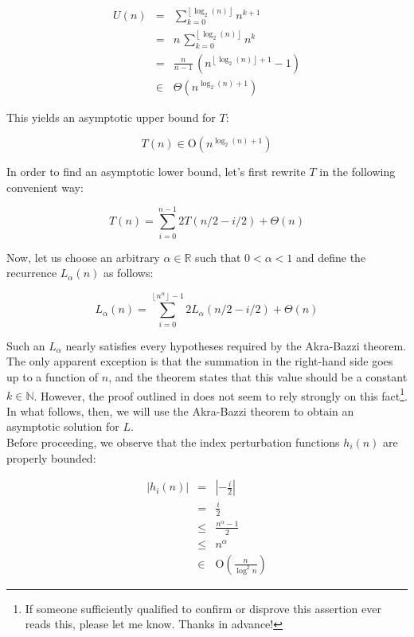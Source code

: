 \documentclass[a4paper,10pt]{article}
\newcommand{\BigO}[1]{\ensuremath{\textrm{O}\left(#1\right)}}
\newcommand{\Nat}{\ensuremath{\mathbb{N}}}
\newcommand{\Real}{\ensuremath{\mathbb{R}}}
\newcommand{\floor}[1]{\ensuremath{\left\lfloor #1 \right\rfloor}}
\begin{document}
\begin{eqnarray*}
    U(n) &=& \displaystyle \sum_{k = 0}^{\floor{\log_2(n)}}{n^{k+1}} \\
         &=& n \, \displaystyle \sum_{k = 0}^{\floor{\log_2(n)}}{n^k} \\
         &=& \frac{n}{n-1} \, \left(n^{\floor{\log_2(n)} + 1} - 1 \right) \\
         &\in& \Theta \left(n^{\log_2(n) + 1} \right)
\end{eqnarray*}

This yields an asymptotic upper bound for $T$:

\begin{equation}
\label{eq:bigO}
    T(n) \in \BigO{n^{\log_2(n) + 1}}
\end{equation}

In order to find an asymptotic lower bound, let's first rewrite $T$ in the following convenient way:

\begin{equation*}
    T(n) = \displaystyle \sum_{i = 0}^{n-1}{2T(n/2 - i/2)} + \Theta(n)
\end{equation*} 

Now, let us choose an arbitrary $\alpha \in \Real$ such that $0 < \alpha < 1$ and define the recurrence $L_{\alpha}(n)$ as follows:

\begin{equation*}
    L_{\alpha}(n) = \displaystyle \sum_{i = 0}^{\floor{n^{\alpha}} - 1}{2L_{\alpha}(n/2 - i/2)} + \Theta(n)
\end{equation*}

Such an $L_{\alpha}$ nearly satisfies every hypotheses required by the Akra-Bazzi theorem\cite{AB}. The only apparent exception is that the summation in the right-hand side goes up to a function of $n$, and the theorem states that this value should be a constant $k \in \Nat$. However, the proof outlined in \cite{AB} does not seem to rely strongly on this fact\footnote{If someone sufficiently qualified to confirm or disprove this assertion ever reads this, please let me know. Thanks in advance!}. In what follows, then, we will use the Akra-Bazzi theorem to obtain an asymptotic solution for $L$.\\

Before proceeding, we observe that the index perturbation functions $h_i(n)$ are properly bounded:

\begin{eqnarray}
\label{eq:h}
    |h_i(n)| &=& |-\frac{i}{2}| \nonumber \\
             &=& \frac{i}{2} \nonumber \\
             &\leq& \frac{n^{\alpha} - 1}{2} \nonumber \\
             &\leq& n^{\alpha} \nonumber \\
             &\in& \BigO{\frac{n}{\log^2{n}}}
\end{eqnarray}
\end{document}
